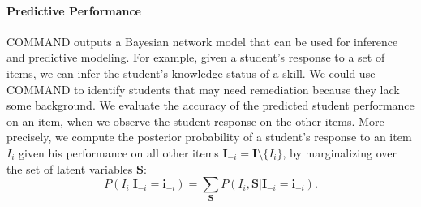 \documentclass{edm_template}
\begin{document}
	\paragraph{Predictive Performance}
	\label{sec:predictive_performance}
	COMMAND outputs a  Bayesian network model that can be used for inference and predictive modeling.
	For example, given a student's response to a set of items, we can infer the student's knowledge status of a skill.
	We could use COMMAND to identify students that may need  remediation because they lack some background.
	We evaluate the accuracy of the predicted student performance  on an item, when we observe the student response on the other items.
	More precisely, we compute the posterior probability of a student's response to an item $I_i$ given his performance on all other items 
	$\mathbf{I}_{-i}=\mathbf{I}\setminus\{I_i\}$, by marginalizing over the set of latent variables $\mathbf{S}$:
\[
		P(I_i|\mathbf{I}_{-i}=\mathbf{i}_{-i}) =\sum_{\mathbf{S}}P(I_i, \mathbf{S}|\mathbf{I}_{-i}=\mathbf{i}_{-i}).
\]
	
\end{document}
